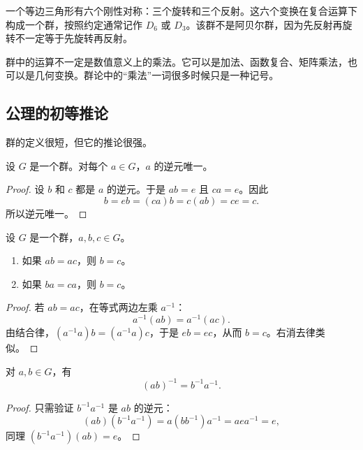 \begin{example}[三角形的对称群]
一个等边三角形有六个刚性对称：三个旋转和三个反射。这六个变换在复合运算下构成一个群，按照约定通常记作 $D_6$ 或 $D_3$。该群不是阿贝尔群，因为先反射再旋转不一定等于先旋转再反射。
\end{example}

\begin{remark}
群中的运算不一定是数值意义上的乘法。它可以是加法、函数复合、矩阵乘法，也可以是几何变换。群论中的“乘法”一词很多时候只是一种记号。
\end{remark}

\subsection{公理的初等推论}

群的定义很短，但它的推论很强。

\begin{proposition}[逆元的唯一性]
设 $G$ 是一个群。对每个 $a\in G$，$a$ 的逆元唯一。
\end{proposition}

\begin{proof}
设 $b$ 和 $c$ 都是 $a$ 的逆元。于是 $ab=e$ 且 $ca=e$。因此
\[
    b=eb=(ca)b=c(ab)=ce=c.
\]
所以逆元唯一。
\end{proof}

\begin{proposition}[消去律]
设 $G$ 是一个群，$a,b,c\in G$。
\begin{enumerate}
    \item 如果 $ab=ac$，则 $b=c$。
    \item 如果 $ba=ca$，则 $b=c$。
\end{enumerate}
\end{proposition}

\begin{proof}
若 $ab=ac$，在等式两边左乘 $a^{-1}$：
\[
    a^{-1}(ab)=a^{-1}(ac).
\]
由结合律，$(a^{-1}a)b=(a^{-1}a)c$，于是 $eb=ec$，从而 $b=c$。右消去律类似。
\end{proof}

\begin{proposition}[乘积的逆元]
对 $a,b\in G$，有
\[
    (ab)^{-1}=b^{-1}a^{-1}.
\]
\end{proposition}

\begin{proof}
只需验证 $b^{-1}a^{-1}$ 是 $ab$ 的逆元：
\[
    (ab)(b^{-1}a^{-1})=a(bb^{-1})a^{-1}=aea^{-1}=e,
\]
同理 $(b^{-1}a^{-1})(ab)=e$。
\end{proof}

